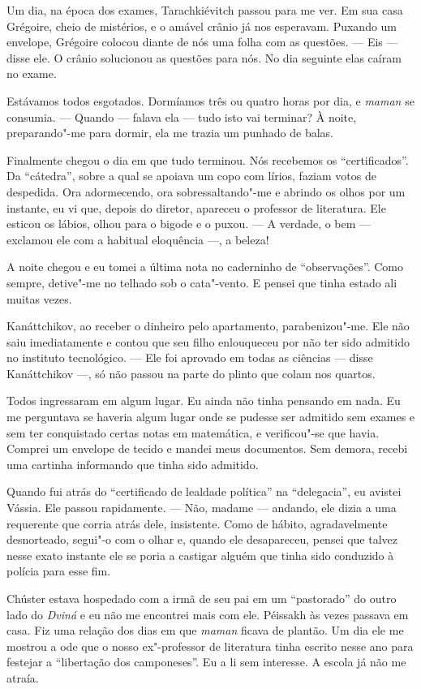 Um dia, na época dos exames, Tarachkiévitch passou para me ver. Em sua
casa Grégoire, cheio de mistérios, e o amável crânio já nos esperavam.
Puxando um envelope, Grégoire colocou diante de nós uma folha com as
questões. --- Eis --- disse ele. O crânio solucionou as questões para
nós. No dia seguinte elas caíram no exame.

Estávamos todos esgotados. Dormíamos três ou quatro horas por dia, e
\emph{maman} se consumia. --- Quando --- falava ela --- tudo isto vai
terminar? À noite, preparando"-me para dormir, ela me trazia um punhado
de balas.

Finalmente chegou o dia em que tudo terminou. Nós recebemos os
``certificados''. Da ``cátedra'', sobre a qual se apoiava um copo com
lírios, faziam votos de despedida. Ora adormecendo, ora
sobressaltando"-me e abrindo os olhos por um instante, eu vi que, depois
do diretor, apareceu o professor de literatura. Ele esticou os lábios,
olhou para o bigode e o puxou. --- A verdade, o bem --- exclamou ele com
a habitual eloquência ---, a beleza!

A noite chegou e eu tomei a última nota no caderninho de
``observações''. Como sempre, detive"-me no telhado sob o cata"-vento. E
pensei que tinha estado ali muitas vezes.

Kanáttchikov, ao receber o dinheiro pelo apartamento, parabenizou"-me.
Ele não saiu imediatamente e contou que seu filho enlouqueceu por não
ter sido admitido no instituto tecnológico. --- Ele foi aprovado em
todas as ciências --- disse Kanáttchikov ---, só não passou na parte do
plinto que colam nos quartos.

Todos ingressaram em algum lugar. Eu ainda não tinha pensando em nada.
Eu me perguntava se haveria algum lugar onde se pudesse ser admitido sem
exames e sem ter conquistado certas notas em matemática, e verificou"-se
que havia. Comprei um envelope de tecido e mandei meus documentos. Sem
demora, recebi uma cartinha informando que tinha sido admitido.

Quando fui atrás do ``certificado de lealdade política'' na
``delegacia'', eu avistei Vássia. Ele passou rapidamente. --- Não,
madame --- andando, ele dizia a uma requerente que corria atrás dele,
insistente. Como de hábito, agradavelmente desnorteado, segui"-o com o
olhar e, quando ele desapareceu, pensei que talvez nesse exato instante
ele se poria a castigar alguém que tinha sido conduzido à polícia para
esse fim.

Chúster estava hospedado com a irmã de seu pai em um ``pastorado'' do
outro lado do \emph{Dviná} e eu não me encontrei mais com ele. Péissakh
às vezes passava em casa. Fiz uma relação dos dias em que \emph{maman}
ficava de plantão. Um dia ele me mostrou a ode que o nosso ex"-professor
de literatura tinha escrito nesse ano para festejar a ``libertação dos
camponeses''. Eu a li sem interesse. A escola já não me atraía.

